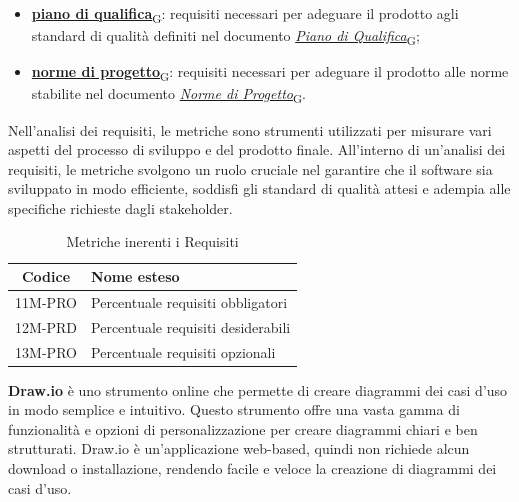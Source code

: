 \begin{enumerate}
\begin{itemize}
		      \item \href{https://7last.github.io/docs/rtb/documentazione-interna/glossario\#piano-di-qualifica}{\textbf{piano di qualifica}\textsubscript{G}}: requisiti necessari per adeguare il prodotto agli standard di qualità definiti nel documento \href{https://7last.github.io/docs/rtb/documentazione-interna/glossario\#piano-di-qualifica}{\textit{Piano di Qualifica}\textsubscript{G}};
		      \item \href{https://7last.github.io/docs/rtb/documentazione-interna/glossario\#norme-di-progetto}{\textbf{norme di progetto}\textsubscript{G}}: requisiti necessari per adeguare il prodotto alle norme stabilite nel documento \href{https://7last.github.io/docs/rtb/documentazione-interna/glossario\#norme-di-progetto}{\textit{Norme di Progetto}\textsubscript{G}}.
	      \end{itemize}
\end{enumerate}


Nell'analisi dei requisiti, le metriche sono strumenti utilizzati per misurare vari aspetti del processo di sviluppo e del prodotto finale. All'interno di un'analisi dei requisiti, le metriche svolgono un ruolo cruciale nel garantire che il software sia sviluppato in modo efficiente, soddisfi gli standard di qualità attesi e adempia alle specifiche richieste dagli stakeholder.
\begin{table}[!h]
	\centering
	\begin{tabular}{|c|l|}
		\hline
		\textbf{Codice} & \textbf{Nome esteso}               \\
		\hline
		11M-PRO         & Percentuale requisiti obbligatori  \\
		12M-PRD         & Percentuale requisiti desiderabili \\
		13M-PRO         & Percentuale requisiti opzionali    \\
		\hline
	\end{tabular}
	\caption{Metriche inerenti i Requisiti}
\end{table}

\textbf{Draw.io} è uno strumento online che permette di creare diagrammi dei casi d'uso in modo semplice e intuitivo. Questo strumento offre una vasta gamma di funzionalità e opzioni di personalizzazione per creare diagrammi chiari e ben strutturati. Draw.io è un'applicazione web-based, quindi non richiede alcun download o installazione, rendendo facile e veloce la creazione di diagrammi dei casi d'uso.

